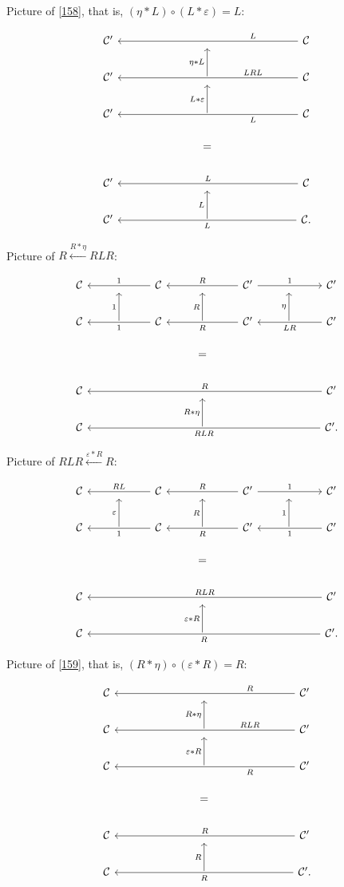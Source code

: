 \documentclass[12pt]{article}%
\theoremstyle{remark}
\theoremstyle{definition}
\newcommand{\C}{\mathcal C}
\newcommand{\ee}{\varepsilon}
\begin{document}
Picture of \eqref{158}, that is, $(\eta*L)\circ(L*\ee)=L$:

$$
\begin{tikzcd}
%
\C'&&&{}&&&\C\ar{llllll}[near start,swap]{L}\\
%
\C'&&&\ar{u}{\eta*L}&&&\C\ar{llllll}[near start,swap]{LRL}\\
%
\C'&&&\ar{u}{L*\ee}&&&\C\ar{llllll}[near start]{L}\\ 
%
&&&=\\ 
%
\C'&&&{}&&&\C\ar{llllll}[swap]{L}\\ 
%
\C'&&&\ar{u}{L}&&&\C.\ar{llllll}{L}
%
\end{tikzcd}
$$ 

Picture of $R\xleftarrow{R*\eta}RLR$:
 
$$
\begin{tikzcd}
%
\C&{}&\C\ar{ll}{}[swap]{1}&{}&\C'\ar{ll}{}[swap]{R}\ar{rr}{}{1}&{}&\C'\\ 
%
\C&\ar{u}{1}&\C\ar{ll}{}{1}&\ar{u}{R}&\C'\ar{ll}{}{R}&\ar{u}{\eta}&\C'\ar{ll}{}{LR}\\ 
%
&&&=\\ 
%
\C&&&{}&&&\C'\ar{llllll}[swap]{R}\\
%
\C&&&\ar{u}{R*\eta}&&&\C'\ar{llllll}{RLR}.
%
\end{tikzcd}
$$ 

Picture of $RLR\xleftarrow{\ee*R}R$:

$$
\begin{tikzcd}
%
\C&{}&\C\ar{ll}{}[swap]{RL}&{}&\C'\ar{ll}{}[swap]{R}\ar{rr}{}{1}&{}&\C'\\ 
%
\C&\ar{u}{\ee}&\C\ar{ll}{}{1}&\ar{u}{R}&\C'\ar{ll}{}{R}&\ar{u}{1}&\C'\ar{ll}{}{1}\\ 
%
&&&=\\ 
%
\C&&&{}&&&\C'\ar{llllll}[swap]{RLR}\\
%
\C&&&\ar{u}{\ee*R}&&&\C'\ar{llllll}{R}.
%
\end{tikzcd}
$$ 

Picture of \eqref{159}, that is, $(R*\eta)\circ(\ee*R)=R$:

$$
\begin{tikzcd}
%
\C&&&{}&&&\C'\ar{llllll}[near start,swap]{R}\\
%
\C&&&\ar{u}{R*\eta}&&&\C'\ar{llllll}[near start,swap]{RLR}\\
%
\C&&&\ar{u}{\ee*R}&&&\C'\ar{llllll}[near start]{R}\\ 
%
&&&=\\ 
%
\C&&&{}&&&\C'\ar{llllll}[swap]{R}\\ 
%
\C&&&\ar{u}{R}&&&\C'.\ar{llllll}{R}
%
\end{tikzcd}
$$
\end{document}
